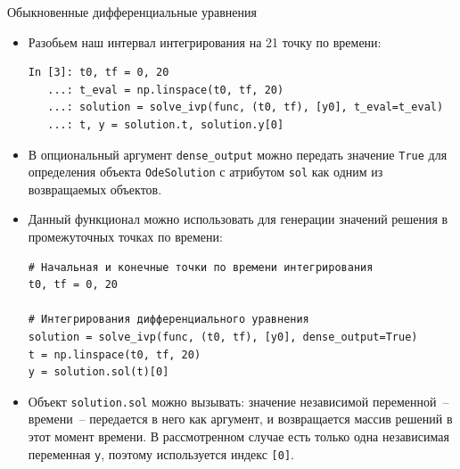 \documentclass[aspectratio=169, mathserif]{beamer}	%
\begin{document}
\begin{frame}[fragile]{Обыкновенные дифференциальные уравнения}
\scriptsize
\begin{itemize}
	\item Разобьем наш интервал интегрирования на 21 точку по времени:

\begin{lstlisting}[language=iPython, numbers=none, frame=none]
In [3]: t0, tf = 0, 20
   ...: t_eval = np.linspace(t0, tf, 20)
   ...: solution = solve_ivp(func, (t0, tf), [y0], t_eval=t_eval)
   ...: t, y = solution.t, solution.y[0]
\end{lstlisting}

	\item В опциональный  аргумент \texttt{dense\_output} можно передать значение \textcolor{ipython_green}{\texttt{True}} для определения объекта \texttt{OdeSolution} с атрибутом \texttt{sol} как одним из возвращаемых объектов. 
	\item Данный функционал можно использовать для генерации значений решения в промежуточных точках по времени:

\begin{lstlisting}[language=iPython, numbers=none, frame=none]
# Начальная и конечные точки по времени интегрирования
t0, tf = 0, 20

# Интегрирования дифференциального уравнения
solution = solve_ivp(func, (t0, tf), [y0], dense_output=True)
t = np.linspace(t0, tf, 20)
y = solution.sol(t)[0]
\end{lstlisting}
	\item Объект \texttt{solution.sol} можно вызывать: значение независимой переменной~-- времени~-- передается в него как аргумент, и возвращается массив решений в этот момент времени. В рассмотренном случае есть только одна независимая переменная \texttt{y}, поэтому используется индекс \texttt{[0]}.
\end{itemize}
\vfil
\end{frame}
\end{document}
